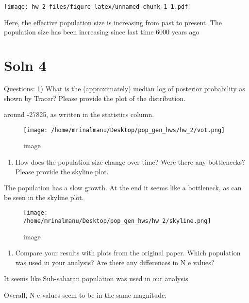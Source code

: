\documentclass[]{article}
\providecommand{\tightlist}{%
  \setlength{\itemsep}{0pt}\setlength{\parskip}{0pt}}
\begin{document}
\texttt{[image: hw\_2\_files/figure-latex/unnamed-chunk-1-1.pdf]}

Here, the effective population size is increasing from past to present.
The population size has been increasing since last time 6000 years ago

\hypertarget{soln-4-1}{%
\section{Soln 4}\label{soln-4-1}}

Questions: 1) What is the (approximately) median log of posterior
probability as shown by Tracer? Please provide the plot of the
distribution.

around -27825, as written in the statistics column.

\begin{figure}
\centering
\texttt{[image: /home/mrinalmanu/Desktop/pop\_gen\_hws/hw\_2/vot.png]}
\caption{image}
\end{figure}

\begin{enumerate}
\def\labelenumi{\arabic{enumi})}
\setcounter{enumi}{1}
\tightlist
\item
  How does the population size change over time? Were there any
  bottlenecks? Please provide the skyline plot.
\end{enumerate}

The population has a slow growth. At the end it seems like a bottleneck,
as can be seen in the skyline plot.

\begin{figure}
\centering
\texttt{[image: /home/mrinalmanu/Desktop/pop\_gen\_hws/hw\_2/skyline.png]}
\caption{image}
\end{figure}

\begin{enumerate}
\def\labelenumi{\arabic{enumi})}
\setcounter{enumi}{2}
\tightlist
\item
  Compare your results with plots from the original paper. Which
  population was used in your analysis? Are there any differences in N e
  values?
\end{enumerate}

It seems like Sub-saharan population was used in our analysis.

Overall, N e values seem to be in the same magnitude.
\end{document}
